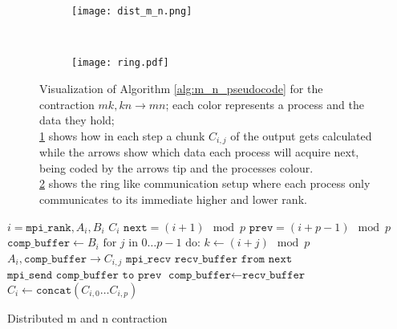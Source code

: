 \begin{figure}[ht]
    \centering
    \begin{subfigure}[t]{0.7\textwidth}
        \centering
        \texttt{[image: dist\_m\_n.png]}
        \label{fig:m_n_algo_a}
    \end{subfigure}
    ~
    \begin{subfigure}[t]{0.25\textwidth}
        \centering\texttt{[image: ring.pdf]}
        \label{fig:m_n_algo_b}
    \end{subfigure}
    
    \caption{Visualization of Algorithm \ref{alg:m_n_pseudocode} for the contraction $mk,kn\rightarrow mn$; 
    each color represents a process and the data they hold;\\
    \ref{fig:m_n_algo_a} shows how in each step a chunk $C_{i,j}$ of the output gets calculated while the arrows show which data each process will acquire next, being coded by the arrows tip and the processes colour.\\
    \ref{fig:m_n_algo_b} shows the ring like communication setup where each process only communicates to its immediate higher and lower rank.
    }
    \label{fig:m_n_algo}
\end{figure}
    

\begin{algorithm}[ht]
        \begin{algorithmic}
        \Require $i = \texttt{mpi\_rank}, A_i, B_i$
        \Ensure $C_i$
        \State $\texttt{next} = (i+1) \mod p$
        \State $\texttt{prev} = (i+p-1) \mod p$
        \State $\texttt{comp\_buffer} \gets B_i$
        \State  $\text{for } j \text{ in } 0\dots p - 1 \text{ do:}$
        \State \indent $k \gets (i + j) \mod p$
        \State \indent {}
        \State \indent \indent $A_i, \texttt{comp\_buffer} \rightarrow C_{i,j}$
        \State \indent \indent $\texttt{mpi\_recv recv\_buffer from next}$
        \State \indent \indent $\texttt{mpi\_send comp\_buffer to prev}$
        \State \indent $\texttt{comp\_buffer} \gets \texttt{recv\_buffer}$
        \State $C_i \gets \texttt{concat}(C_{i,0}\dots C_{i,p})$
    \end{algorithmic}
    \caption{Distributed m and n contraction}
    \label{alg:m_n_pseudocode}
\end{algorithm}

